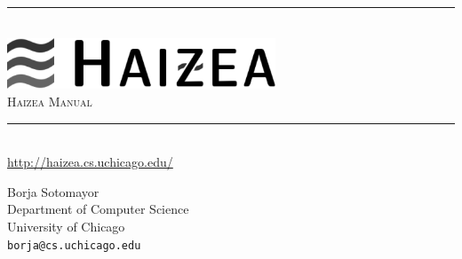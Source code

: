 \newcommand{\HRule}{\rule{\linewidth}{0.5mm}}

\begin{titlepage}
 
\begin{center}
 
\HRule \\[0.4cm]
\includegraphics[width=0.6\textwidth]{images/haizea.png}\\[1cm]
\textsc{ \huge Haizea Manual}\\[0.4cm]
 
\HRule \\[1.5cm]
\url{http://haizea.cs.uchicago.edu/}

\vfill
 
\begin{flushright} \large
Borja Sotomayor\\
Department of Computer Science\\
University of Chicago\\
\texttt{borja@cs.uchicago.edu}
\end{flushright}
 
\end{center}
 
\end{titlepage}
